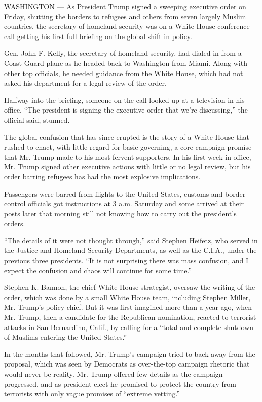 WASHINGTON --- As President Trump signed a sweeping executive order on
Friday, shutting the borders to refugees and others from seven largely
Muslim countries, the secretary of homeland security was on a White
House conference call getting his first full briefing on the global
shift in policy.

Gen. John F. Kelly, the secretary of homeland security, had dialed in
from a Coast Guard plane as he headed back to Washington from Miami.
Along with other top officials, he needed guidance from the White House,
which had not asked his department for a legal review of the order.

Halfway into the briefing, someone on the call looked up at a television
in his office. ``The president is signing the executive order that we're
discussing,'' the official said, stunned.

The global confusion that has since erupted is the story of a White
House that rushed to enact, with little regard for basic governing, a
core campaign promise that Mr. Trump made to his most fervent
supporters. In his first week in office, Mr. Trump signed other
executive actions with little or no legal review, but his order barring
refugees has had the most explosive implications.

Passengers were barred from flights to the United States, customs and
border control officials got instructions at 3 a.m. Saturday and some
arrived at their posts later that morning still not knowing how to carry
out the president's orders.

``The details of it were not thought through,'' said Stephen Heifetz,
who served in the Justice and Homeland Security Departments, as well as
the C.I.A., under the previous three presidents. ``It is not surprising
there was mass confusion, and I expect the confusion and chaos will
continue for some time.''

Stephen K. Bannon, the chief White House strategist, oversaw the writing
of the order, which was done by a small White House team, including
Stephen Miller, Mr. Trump's policy chief. But it was first imagined more
than a year ago, when Mr. Trump, then a candidate for the Republican
nomination, reacted to terrorist attacks in San Bernardino, Calif., by
calling for a ``total and complete shutdown of Muslims entering the
United States.''

In the months that followed, Mr. Trump's campaign tried to back away
from the proposal, which was seen by Democrats as over-the-top campaign
rhetoric that would never be reality. Mr. Trump offered few details as
the campaign progressed, and as president-elect he promised to protect
the country from terrorists with only vague promises of ``extreme
vetting.''

